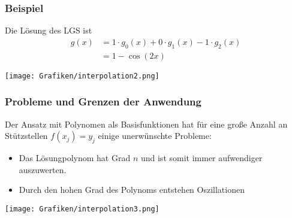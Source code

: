 %
%
\begin{frame}\frametitle{Beispiel}
Die Lösung des LGS ist 
\begin{align*}
g(x)&=1\cdot g_0(x)+0\cdot g_1(x)-1\cdot g_2(x)\\
&=1-\cos(2x)
\end{align*}
\begin{center}
\texttt{[image: Grafiken/interpolation2.png]}
\end{center}	

\end{frame}
%
\begin{frame}\frametitle{Probleme und Grenzen der Anwendung}
Der Ansatz mit Polynomen als Basisfunktionen hat für eine große Anzahl an Stützstellen $f(x_j)=y_j$ einige unerwünschte Probleme:
\begin{itemize}
\item Das Lösungpolynom hat Grad $n$ und ist somit immer aufwendiger auszuwerten.
\item Durch den hohen Grad des Polynoms entstehen Oszillationen
\end{itemize}
\begin{center}
\texttt{[image: Grafiken/interpolation3.png]}
\end{center}	
\end{frame}
%
%
